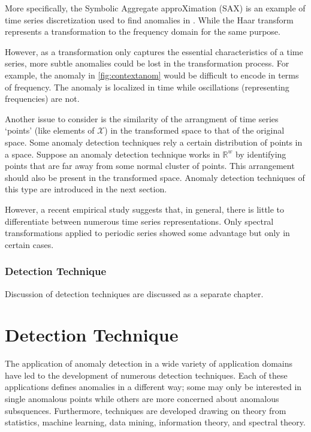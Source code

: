 More specifically, the Symbolic Aggregate approXimation (SAX) \cite{Lin2007} is an example of time series discretization used to find anomalies in  \cite{Keogh2005}. While the Haar transform represents a transformation to the frequency domain \cite{Bu2007,fu2006finding} for the same purpose.

However, as a transformation only captures the essential characteristics of a time series, more subtle anomalies could be lost in the transformation process. For example, the anomaly in \ref{fig:contextanom} would be difficult to encode in terms of frequency. The anomaly is localized in time while oscillations (representing frequencies) are not. 

Another issue to consider is the similarity of the arrangment of time series `points' (like elements of $\mathcal{X}$) in the transformed space to that of the original space. Some anomaly detection techniques rely a certain distribution of points in a space. Suppose an anomaly detection technique works in $\mathbb{R}^w$ by identifying points that are far away from some normal cluster of points. This arrangement should also be present in the transformed space. Anomaly detection techniques of this type are introduced in the next section. %

However, a recent empirical study \cite{Wang2013} suggests that, in general, there is little to differentiate between numerous time series representations. Only spectral transformations applied to periodic series showed some advantage but only in certain cases.

\subsection[adtechnique]{Detection Technique}

Discussion of detection techniques are discussed as a separate chapter.

\chapter[adtechnique]{Detection Technique}

The application of anomaly detection in a wide variety of application domains have led to the development of numerous detection techniques. Each of these applications defines anomalies in a different way;  some  may only be interested in single anomalous points while others are more concerned about anomalous subsquences. Furthermore, techniques are developed drawing on theory from statistics, machine learning, data mining, information theory, and spectral theory.


